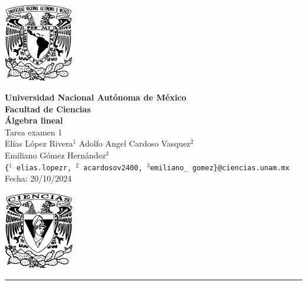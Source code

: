 \documentclass[11pt,letterpaper]{article}
\begin{document}

\begin{center}
    \begin{minipage}{3cm}
    	\begin{center}
    		\includegraphics[height=3.4cm]{logo_unam.png}
    	\end{center}
    \end{minipage}\hfill
    \begin{minipage}{10cm}
    	\begin{center}
    	\textbf{\large Universidad Nacional Autónoma de México}\\[0.1cm]
        \textbf{Facultad de Ciencias}\\[0.1cm]
        \textbf{\'Algebra lineal}\\[0.1cm]
        Tarea examen 1 \\[0.1cm]
         El\'ias L\'opez Rivera$^{1}$\,\,Adolfo Angel Cardoso Vasquez$^{2}$\\[0.1cm]
		Emiliano G\'omez Hern\'andez$^{3}$\\[0.1cm]
        \texttt{\{$^{1}$ elias.lopezr,\,${^2}$ acardosov2400,\,$^{3}$emiliano\_ gomez\}@ciencias.unam.mx }\\[0.1cm]
        Fecha:\,\,20/10/2024
    	\end{center}
    \end{minipage}\hfill
    \begin{minipage}{3cm}
    	\begin{center}
    		\includegraphics[height=3.4cm]{Logo_FC.png}
    	\end{center}
    \end{minipage}
\end{center}

\rule{17cm}{0.1mm}
\end{document}
